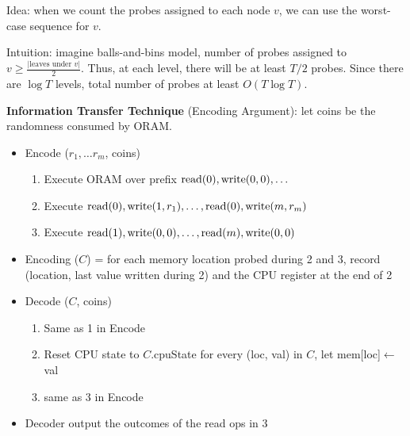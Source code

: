 {Idea: when we count the probes assigned to each node $v$, we can use the worst-case sequence for $v$.

Intuition: imagine balls-and-bins model, number of probes assigned to $v \geq\frac{|\mbox{leaves under } v|}{2}$. Thus, at each level, there will be at least $T/2$ probes. Since there are $\log T$ levels, total number of probes at least $O(T \log T)$.

\textbf{Information Transfer Technique} (Encoding Argument): let coins be the randomness consumed by ORAM.
\begin{itemize}
  \item Encode ($r_1, \dots r_m$, coins)
  \begin{enumerate}
    \item Execute ORAM over prefix $\mbox{read}(0), \mbox{write}(0, 0), \dots$
    \item Execute $\mbox{read}(0), \mbox{write}(1, r_1), \dots, \mbox{read}(0), \mbox{write}(m, r_m)$
    \item Execute $\mbox{read}(1), \mbox{write}(0, 0), \dots, \mbox{read}(m), \mbox{write}(0, 0)$
  \end{enumerate}
  \item Encoding ($C$) = for each memory location probed during 2 and 3, record (location, last value written during 2) and the CPU register at the end of 2
  \item Decode ($C$, coins)
  \begin{enumerate}
    \item Same as 1 in Encode
    \item Reset CPU state to $C$.cpuState for every (loc, val) in $C$, let mem[loc]$\leftarrow$ val
    \item same as 3 in Encode
  \end{enumerate}
  \item Decoder output the outcomes of the read ops in 3
\end{itemize}
}
